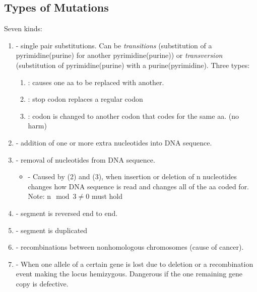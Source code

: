 \documentclass[../Bio_chemistryReview.tex]{subfiles}
\begin{document}
\subsection{Types of Mutations}
Seven kinds:
\begin{enumerate}
  \item {} - single pair substitutions. Can be
          \emph{transitions} (substitution of a pyrimidine(purine) for another
          pyrimidine(purine)) or \emph{transversion} (substitution of
          pyrimidine(purine) with a purine(pyrimidine). Three types:
          \begin{enumerate}
            \item {}: causes one aa to be replaced
              with another.  
            \item {}: stop codon
              replaces a regular codon 
            \item {}: codon
              is changed to another codon that codes for the same aa. (no
              harm) 
          \end{enumerate}
        \item {} - addition of one or more extra nucleotides
          into DNA sequence.  
        \item {} - removal of nucleotides
          from DNA sequence.
          \begin{itemize}
            \item {} - Caused by (2) and (3), when
              insertion or deletion of n nucleotides changes how DNA sequence is
              read and changes all of the aa coded for. Note: n$ \mod 3 \neq 0 $
              must hold 
          \end{itemize}
        \item {} - segment is reversed end to end.
        \item {} - segment is duplicated
        \item {} - recombinations
          between nonhomologous chromosomes (cause of cancer).  
        \item {} - When one allele of a certain gene
          is lost due to deletion or a recombination event making the locus
          hemizygous.  Dangerous if the one remaining gene copy is defective.
\end{enumerate}
\end{document}
